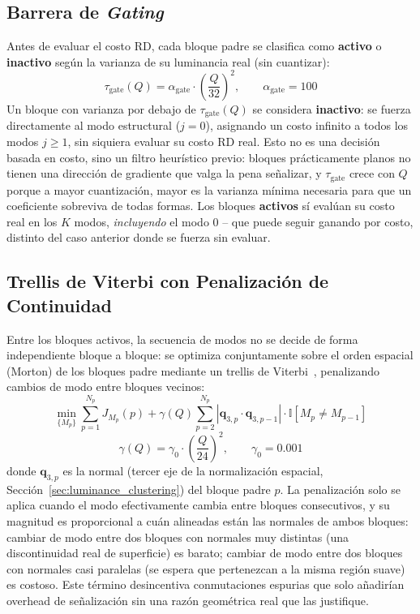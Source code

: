     \subsection{Barrera de \textit{Gating}}
        Antes de evaluar el costo RD, cada bloque padre se clasifica como \textbf{activo} o
        \textbf{inactivo} según la varianza de su luminancia real (sin cuantizar):
        \begin{equation}
            \tau_{\text{gate}}(Q) = \alpha_{\text{gate}} \cdot \left(\frac{Q}{32}\right)^2, \qquad \alpha_{\text{gate}} = 100
        \end{equation}
        Un bloque con varianza por debajo de $\tau_{\text{gate}}(Q)$ se considera
        \textbf{inactivo}: se fuerza directamente al modo estructural ($j=0$), asignando un
        costo infinito a todos los modos $j\geq 1$, sin siquiera evaluar su costo RD real. Esto
        no es una decisión basada en costo, sino un filtro heurístico previo: bloques
        prácticamente planos no tienen una dirección de gradiente que valga la pena señalizar,
        y $\tau_{\text{gate}}$ crece con $Q$ porque a mayor cuantización, mayor es la varianza
        mínima necesaria para que un coeficiente sobreviva de todas formas. Los bloques
        \textbf{activos} sí evalúan su costo real en los $K$ modos, \emph{incluyendo} el modo
        0 -- que puede seguir ganando por costo, distinto del caso anterior donde se fuerza sin
        evaluar.

    \subsection{Trellis de Viterbi con Penalización de Continuidad}
        Entre los bloques activos, la secuencia de modos no se decide de forma independiente
        bloque a bloque: se optimiza conjuntamente sobre el orden espacial (Morton) de los
        bloques padre mediante un trellis de Viterbi~\cite{viterbi1967error}, penalizando cambios de modo entre bloques vecinos:
        \begin{equation}
            \min_{\{M_p\}} \sum_{p=1}^{N_p} J_{M_p}(p) + \gamma(Q) \sum_{p=2}^{N_p} |\mathbf{q}_{3,p} \cdot \mathbf{q}_{3,p-1}| \cdot \mathbb{I}[M_p \neq M_{p-1}]
        \end{equation}
        \begin{equation}
            \gamma(Q) = \gamma_0 \cdot \left(\frac{Q}{24}\right)^2, \qquad \gamma_0 = 0.001
        \end{equation}
        donde $\mathbf{q}_{3,p}$ es la normal (tercer eje de la normalización espacial,
        Sección~\ref{sec:luminance_clustering}) del bloque padre $p$. La penalización solo se
        aplica cuando el modo efectivamente cambia entre bloques consecutivos, y su magnitud es
        proporcional a cuán alineadas están las normales de ambos bloques: cambiar de modo entre
        dos bloques con normales muy distintas (una discontinuidad real de superficie) es
        barato; cambiar de modo entre dos bloques con normales casi paralelas (se espera que
        pertenezcan a la misma región suave) es costoso. Este término desincentiva
        conmutaciones espurias que solo añadirían overhead de señalización sin una razón
        geométrica real que las justifique.

